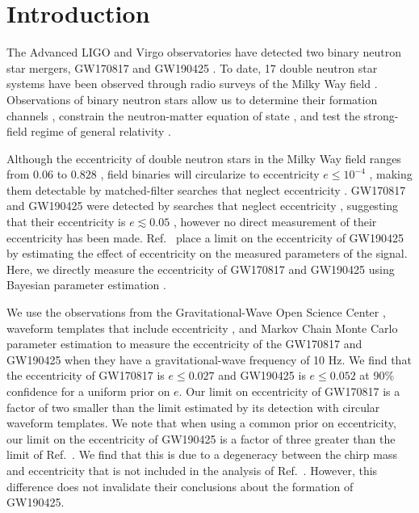 \section{Introduction}
\label{sec:pe-intro}
The Advanced LIGO and Virgo observatories have detected two binary neutron star mergers, GW170817 \cite{TheLIGOScientific:2017qsa} and GW190425 \cite{Abbott:2020uma}. To date, 17 double neutron star systems have been observed through radio surveys of the Milky Way field \cite{Martinez:2017jbp,Tauris:2017omb,Cameron:2017ody,Stovall:2018ouw,Lynch:2018zxo}. Observations of binary neutron stars allow us to determine their formation channels \cite{Smarr1976,Canal:1990dz,PortegiesZwart1:1997zn,Postnov:2006hka,Kalogera:2006uj,Kowalska:2010qg,Tauris:2017omb,Belczynski:2018ptv,Vigna-Gomez:2018dza,Giacobbo:2018etu,Mapelli:2018wys,Andrews:2019vou}, constrain the neutron-matter equation of state \cite{Bauswein:2017vtn,Annala:2017llu,Fattoyev:2017jql,De:2018uhw,Abbott:2018exr,Capano:2019eae,Tews:2018iwm,Most:2018hfd,Radice:2018ozg,Coughlin:2018fis,Forbes:2019xaz}, and test the strong-field regime of general relativity \cite{Abbott:2018lct}.

Although the eccentricity of double neutron stars in the Milky Way field ranges from $0.06$ to $0.828$ \cite{Zhu:2017znf,Andrews:2019vou}, field binaries will circularize to eccentricity $e \leq 10^{-4}$ \cite{Peters:1964zz,Kowalska:2010qg}, making them detectable by matched-filter searches that neglect eccentricity \cite{Martel:1999tm,Cokelaer:2009hj,Brown:2009ng,Huerta:2013qb}.
GW170817 and GW190425 were detected by searches that neglect eccentricity \cite{TheLIGOScientific:2017qsa,Abbott:2020uma}, suggesting that their eccentricity is $e \lesssim 0.05$ \cite{Huerta:2013qb}, however no direct measurement of their eccentricity has been made. Ref.~\cite{10.1093/mnrasl/slaa084} place a limit on the eccentricity of GW190425 by estimating the effect of eccentricity on the measured parameters of the signal. Here, we directly measure the eccentricity of GW170817 and GW190425 using Bayesian parameter estimation \cite{Biwer:2018osg}.

We use the observations from the Gravitational-Wave Open Science Center \cite{TheLIGOScientific:2017qsa,Abbott:2020uma}, waveform templates that include eccentricity \cite{Moore:2016qxz}, and Markov Chain Monte Carlo parameter estimation \cite{ForemanMackey:2012ig,Biwer:2018osg} to measure the eccentricity of the GW170817 and GW190425 when they have a gravitational-wave frequency of 10 Hz. We find that the eccentricity of GW170817 is $e \leq 0.027$ and GW190425 is $e \leq 0.052$ at 90\% confidence for a uniform prior on $e$. Our limit on eccentricity of GW170817 is a factor of two smaller than the limit estimated by its detection with circular waveform templates. We note that when using a common prior on eccentricity, our limit on the eccentricity of GW190425 is a factor of three greater than the limit of Ref.~\cite{10.1093/mnrasl/slaa084}. We find that this is due to a degeneracy between the chirp mass and eccentricity that is not included in the analysis of Ref.~\cite{10.1093/mnrasl/slaa084}. However, this difference does not invalidate their conclusions about the formation of GW190425.

